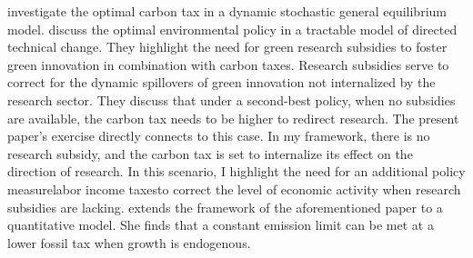  \cite{Golosov2014OptimalEquilibrium} investigate the optimal carbon tax in a dynamic stochastic general equilibrium model.  
\cite{Acemoglu2012TheChange} discuss the optimal environmental policy in a tractable model of directed technical change.
They highlight the need for green research subsidies to foster green innovation in combination with carbon taxes. Research subsidies serve to correct for the dynamic spillovers of green innovation not internalized by the research sector. They discuss that under a second-best policy, when no subsidies are available, the carbon tax needs to be higher to redirect research. The present paper's exercise 
directly connects to this case. In my framework, there is no research subsidy, and the carbon tax is set to internalize its effect on the direction of research. In this scenario, I highlight the need for an additional policy measure\textemdash labor income taxes\textemdash to correct the level of economic activity when research subsidies are lacking. 
\cite{Fried2018ClimateAnalysis} extends the framework of the aforementioned paper to a quantitative model. %
She finds that a constant emission limit can be met at a lower fossil tax when growth is endogenous. %



